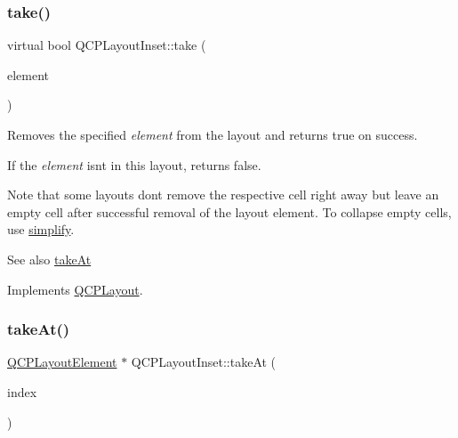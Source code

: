 \subsubsection{\texorpdfstring{take()}{take()}\hspace{0.1cm}{\footnotesize\ttfamily [2/2]}}
{\footnotesize\ttfamily virtual bool Q\+C\+P\+Layout\+Inset\+::take (\begin{DoxyParamCaption}\item[{\hyperlink{class_q_c_p_layout_element}{Q\+C\+P\+Layout\+Element} $\ast$}]{element }\end{DoxyParamCaption})\hspace{0.3cm}{\ttfamily [virtual]}}

Removes the specified {\itshape element} from the layout and returns true on success.

If the {\itshape element} isn\textquotesingle{}t in this layout, returns false.

Note that some layouts don\textquotesingle{}t remove the respective cell right away but leave an empty cell after successful removal of the layout element. To collapse empty cells, use \hyperlink{class_q_c_p_layout_inset_a18b7d508f0baa60cc5dcb1343cf7f32a}{simplify}.

\begin{DoxySeeAlso}{See also}
\hyperlink{class_q_c_p_layout_inset_abf2e8233f5b7051220907e62ded490a2}{take\+At} 
\end{DoxySeeAlso}


Implements \hyperlink{class_q_c_p_layout_ada26cd17e56472b0b4d7fbbc96873e4c}{Q\+C\+P\+Layout}.

\mbox{\label{class_q_c_p_layout_inset_abf2e8233f5b7051220907e62ded490a2}} 
\subsubsection{\texorpdfstring{take\+At()}{takeAt()}\hspace{0.1cm}{\footnotesize\ttfamily [1/2]}}
{\footnotesize\ttfamily \hyperlink{class_q_c_p_layout_element}{Q\+C\+P\+Layout\+Element} $\ast$ Q\+C\+P\+Layout\+Inset\+::take\+At (\begin{DoxyParamCaption}\item[{int}]{index }\end{DoxyParamCaption})\hspace{0.3cm}{\ttfamily [virtual]}}

